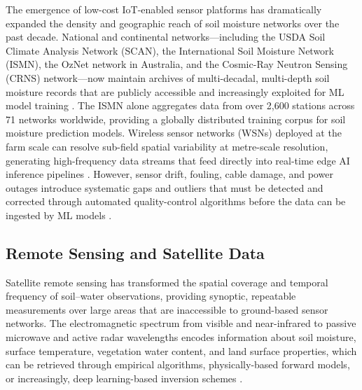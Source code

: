 \documentclass[land,article,submit,pdftex,moreauthors]{Definitions/mdpi}
\numberwithin{equation}{section}
\begin{document}
The emergence of low-cost IoT-enabled sensor platforms has dramatically expanded the density and geographic reach of soil moisture networks over the past decade. National and continental networks---including the USDA Soil Climate Analysis Network (SCAN), the International Soil Moisture Network (ISMN), the OzNet network in Australia, and the Cosmic-Ray Neutron Sensing (CRNS) network---now maintain archives of multi-decadal, multi-depth soil moisture records that are publicly accessible and increasingly exploited for ML model training \citep{dorigo2021ismn}. The ISMN alone aggregates data from over 2,600 stations across 71 networks worldwide, providing a globally distributed training corpus for soil moisture prediction models. Wireless sensor networks (WSNs) deployed at the farm scale can resolve sub-field spatial variability at metre-scale resolution, generating high-frequency data streams that feed directly into real-time edge AI inference pipelines \citep{vij2020iot}. However, sensor drift, fouling, cable damage, and power outages introduce systematic gaps and outliers that must be detected and corrected through automated quality-control algorithms before the data can be ingested by ML models \citep{gruber2020}.

\subsection{Remote Sensing and Satellite Data}

Satellite remote sensing has transformed the spatial coverage and temporal frequency of soil--water observations, providing synoptic, repeatable measurements over large areas that are inaccessible to ground-based sensor networks. The electromagnetic spectrum from visible and near-infrared to passive microwave and active radar wavelengths encodes information about soil moisture, surface temperature, vegetation water content, and land surface properties, which can be retrieved through empirical algorithms, physically-based forward models, or increasingly, deep learning-based inversion schemes \citep{petropoulos2015}.
\end{document}
